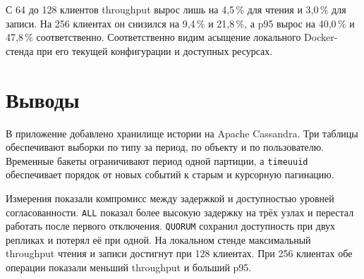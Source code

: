 \documentclass[12pt,a4paper]{article}
\begin{document}
С 64 до 128 клиентов throughput вырос лишь на 4,5\,\% для чтения и 3,0\,\% для записи. На 256 клиентах он снизился на 9,4\,\% и 21,8\,\%, а p95 вырос на 40,0\,\% и 47,8\,\% соответственно. Соответственно видим асыщение локального Docker-стенда при его текущей конфигурации и доступных ресурсах.

\section{Выводы}

В приложение добавлено хранилище истории на Apache Cassandra. Три таблицы обеспечивают выборки по типу за период, по объекту и по пользователю. Временные бакеты ограничивают период одной партиции, а \texttt{timeuuid} обеспечивает порядок от новых событий к старым и курсорную пагинацию.

Измерения показали компромисс между задержкой и доступностью уровней согласованности. \texttt{ALL} показал более высокую задержку на трёх узлах и перестал работать после первого отключения. \texttt{QUORUM} сохранил доступность при двух репликах и потерял её при одной. На локальном стенде максимальный throughput чтения и записи достигнут при 128 клиентах. При 256 клиентах обе операции показали меньший throughput и больший p95.
\end{document}
